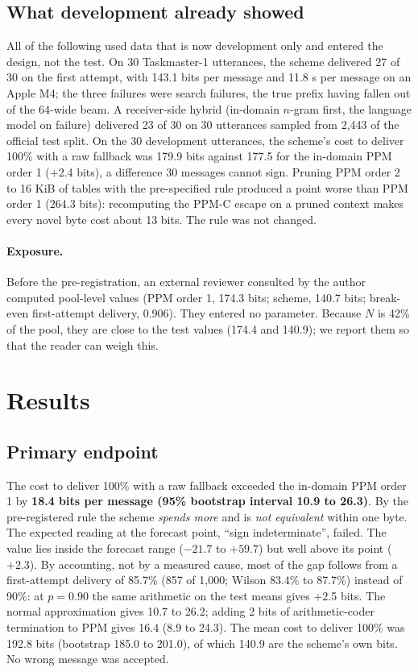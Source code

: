 \documentclass[11pt]{article}
\begin{document}
\subsection{What development already showed}

All of the following used data that is now development only and entered the design, not the test.
On 30 Taskmaster-1 utterances, the scheme delivered 27 of 30 on the first attempt, with 143.1 bits per
message and 11.8 s per message on an Apple M4; the three failures were search failures, the true
prefix having fallen out of the 64-wide beam. A receiver-side hybrid (in-domain $n$-gram first, the
language model on failure) delivered 23 of 30 on 30 utterances sampled from 2,443 of the official
test split. On the 30 development utterances, the scheme's cost to deliver 100\% with a raw fallback
was 179.9 bits against 177.5 for the in-domain PPM order 1 (+2.4 bits), a difference 30 messages
cannot sign. Pruning PPM order 2 to 16 KiB of tables with the pre-specified rule produced a point
worse than PPM order 1 (264.3 bits): recomputing the PPM-C escape on a pruned context makes every novel
byte cost about 13 bits. The rule was not changed.

\paragraph{Exposure.} Before the pre-registration, an external reviewer consulted by the author computed pool-level values (PPM
order 1, 174.3 bits; scheme, 140.7 bits; break-even first-attempt delivery, 0.906). They entered no
parameter. Because $N$ is 42\% of the pool, they are close to the test values (174.4 and 140.9); we
report them so that the reader can weigh this.

\section{Results}\label{sec:results}

\subsection{Primary endpoint}

The cost to deliver 100\% with a raw fallback exceeded the in-domain PPM order 1 by
\textbf{18.4 bits per message (95\% bootstrap interval 10.9 to 26.3)}. By the pre-registered rule the
scheme \emph{spends more} and is \emph{not equivalent} within one byte. The expected reading at the
forecast point, ``sign indeterminate'', failed. The value lies inside the forecast range ($-21.7$ to
$+59.7$) but well above its point ($+2.3$). By accounting, not by a measured cause, most of the gap
follows from a first-attempt delivery of 85.7\% (857 of 1,000; Wilson 83.4\% to 87.7\%) instead of
90\%: at $p = 0.90$ the same arithmetic on the test means gives +2.5 bits. The normal approximation
gives 10.7 to 26.2; adding 2 bits of arithmetic-coder termination to PPM gives 16.4 (8.9 to 24.3). The
mean cost to deliver 100\% was 192.8 bits (bootstrap 185.0 to 201.0), of which 140.9 are the scheme's
own bits. No wrong message was accepted.
\end{document}
